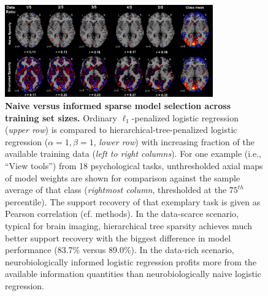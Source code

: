 \documentclass{article}
\begin{document}
\begin{figure}
\begin{centering}
\includegraphics[width=0.80\textwidth]{../figures/dataratio_trans.pdf}
\caption{\textbf{Naive versus informed sparse model selection
across training set sizes.}
Ordinary $\ell_1$-penalized logistic regression
(\textit{upper row})
is compared
to hierarchical-tree-penalized logistic regression
($\alpha = 1, \beta = 1$, \textit{lower row})
with increasing fraction
of the available training data (\textit{left to right columns}).
For one example (i.e., ``View tools'') from 18 psychological tasks,
unthresholded axial maps of model weights
are shown for comparison against
the sample average of that class
(\textit{rightmost column}, thresholded at the $75^{th}$ percentile).
The support recovery of that exemplary task is given
as Pearson correlation (cf. methods).
%
In the data-scarce scenario,
typical for brain imaging,
hierarchical tree sparsity achieves much
better support recovery with the biggest difference
in model performance (83.7\% versus 89.0\%).
%
In the data-rich scenario,
neurobiologically informed logistic regression
profits more from the available information quantities than
neurobiologically naive logistic regression.
}
\label{fig_dataratio}
\end{centering}
\end{figure}
\end{document}
